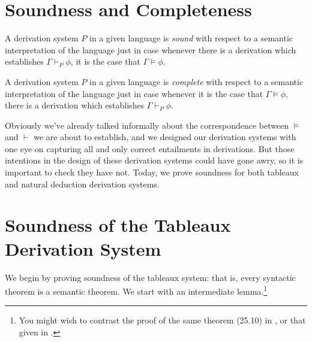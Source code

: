 \section{Soundness and Completeness} \label{sec:tsoundcomp}


A derivation system $P$ in a given language is \emph{sound} with respect to a semantic interpretation of the language just in case whenever there is a derivation which establishes $\Gamma \vdash_{P} \phi$, it is the case that $\Gamma \vDash \phi$.

A derivation system $P$ in a given language is \emph{complete} with respect to a semantic interpretation of the language just in case whenever it is the case that $\Gamma \vDash \phi$, there is a derivation which establishes $\Gamma \vdash_{P} \phi$.

Obviously we've already talked informally about the correspondence between $\vDash$ and $\vdash$ we are about to establish, and we designed our derivation systems with one eye on capturing all and only correct entailments in derivations. But those intentions in the design of these derivation systems could have gone awry, so it is important to check they have not. Today, we prove soundness for both tableaux and natural deduction derivation systems.


\section{Soundness of the Tableaux Derivation System}

We begin by proving soundness of the tableaux system: that is, every syntactic theorem is a semantic theorem. We start with an intermediate lemma.\footnote{You might wish to contrast the proof of the same theorem (25.10) in \citet[118--9]{hodges}, or that given in \citet[{\S}4.5]{bostock}.}

